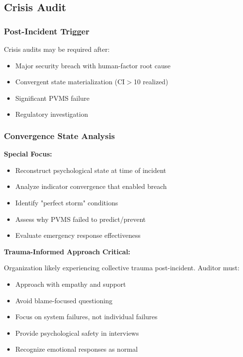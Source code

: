 \documentclass[11pt,a4paper]{article}
\begin{document}
\subsection{Crisis Audit}

\subsubsection{Post-Incident Trigger}

Crisis audits may be required after:
\begin{itemize}
\item Major security breach with human-factor root cause
\item Convergent state materialization (CI$>$10 realized)
\item Significant PVMS failure
\item Regulatory investigation
\end{itemize}

\subsubsection{Convergence State Analysis}

\textbf{Special Focus:}

\begin{itemize}
\item Reconstruct psychological state at time of incident
\item Analyze indicator convergence that enabled breach
\item Identify "perfect storm" conditions
\item Assess why PVMS failed to predict/prevent
\item Evaluate emergency response effectiveness
\end{itemize}

\textbf{Trauma-Informed Approach Critical:}

Organization likely experiencing collective trauma post-incident. Auditor must:
\begin{itemize}
\item Approach with empathy and support
\item Avoid blame-focused questioning
\item Focus on system failures, not individual failures
\item Provide psychological safety in interviews
\item Recognize emotional responses as normal
\end{itemize}
\end{document}
